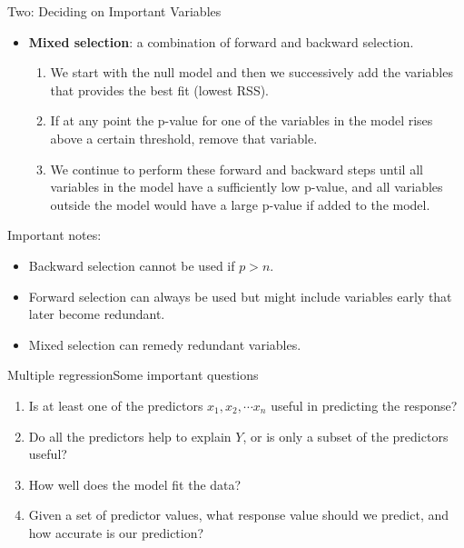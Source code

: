 \begin{frame}{Two: Deciding on Important Variables}

\begin{itemize}
    \item \textbf{Mixed selection}: a combination of forward and backward selection. \pause
    \begin{enumerate}
        \item We start with the null model and then we successively add the variables that provides the best fit (lowest RSS). \pause
        \item If at any point the p-value for one of the variables in the model rises above a certain threshold, remove that variable. \pause
        \item We continue to perform these forward and backward steps until all variables in the model have a suﬃciently low p-value, and all variables outside the model would have a large p-value if added to the model. \pause
    \end{enumerate}
\end{itemize}

Important notes: \pause
\begin{itemize}
    \item Backward selection cannot be used if $p > n$. \pause
    \item Forward selection can always be used but might include variables early that later become redundant. \pause
    \item Mixed selection can remedy redundant variables.
\end{itemize}

        
\end{frame}


\begin{frame}[noframenumbering]{Multiple regression}{Some important questions}

\begin{enumerate}
    \item<1> Is at least one of the predictors $x_1, x_2, \cdots x_n$ useful in predicting the response?  
    \item<1> Do all the predictors help to explain $Y$, or is only a subset of the predictors useful? 
    \item<1-2> How well does the model fit the data? 
    \item<1> Given a set of predictor values, what response value should we predict, and how accurate is our prediction?
    
\end{enumerate}
\end{frame}

